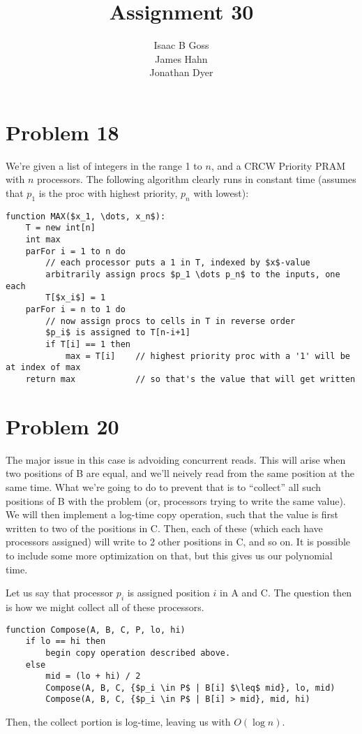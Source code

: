 \documentclass{article}
\author{Isaac B Goss\\ James Hahn\\ Jonathan Dyer}
\title{Assignment 30}
\providecommand{\prob}[1]{\section*{Problem #1}}
\begin{document}
\maketitle
\prob{18}
We're given a list of integers in the range 1 to $n$, and a CRCW Priority PRAM with $n$ processors. The following algorithm clearly runs in constant time (assumes that $p_1$ is the proc with highest priority, $p_n$ with lowest):
\begin{lstlisting}
function MAX($x_1, \dots, x_n$):
    T = new int[n]
    int max
    parFor i = 1 to n do
        // each processor puts a 1 in T, indexed by $x$-value
        arbitrarily assign procs $p_1 \dots p_n$ to the inputs, one each
        T[$x_i$] = 1
    parFor i = n to 1 do
        // now assign procs to cells in T in reverse order
        $p_i$ is assigned to T[n-i+1]
        if T[i] == 1 then
            max = T[i]    // highest priority proc with a '1' will be at index of max
    return max            // so that's the value that will get written
\end{lstlisting}

\prob{20}

The major issue in this case is advoiding concurrent reads.
This will arise when two positions of B are equal, and we'll neively read from the same position at the same time.
What we're going to do to prevent that is to ``collect'' all such positions of B with the problem (or, processors trying to write the same value).
We will then implement a log-time copy operation, such that the value is first written to two of the positions in C.
Then, each of these (which each have processors assigned) will write to 2 other positions in C, and so on.
It is possible to include some more optimization on that, but this gives us our polynomial time.

Let us say that processor $p_i$ is assigned position $i$ in A and C.
The question then is how we might collect all of these processors.
\begin{lstlisting}
function Compose(A, B, C, P, lo, hi)
    if lo == hi then
        begin copy operation described above.
    else
        mid = (lo + hi) / 2
        Compose(A, B, C, {$p_i \in P$ | B[i] $\leq$ mid}, lo, mid)
        Compose(A, B, C, {$p_i \in P$ | B[i] > mid}, mid, hi)
\end{lstlisting}

Then, the collect portion is log-time, leaving us with $O(\log n)$.
\end{document}
